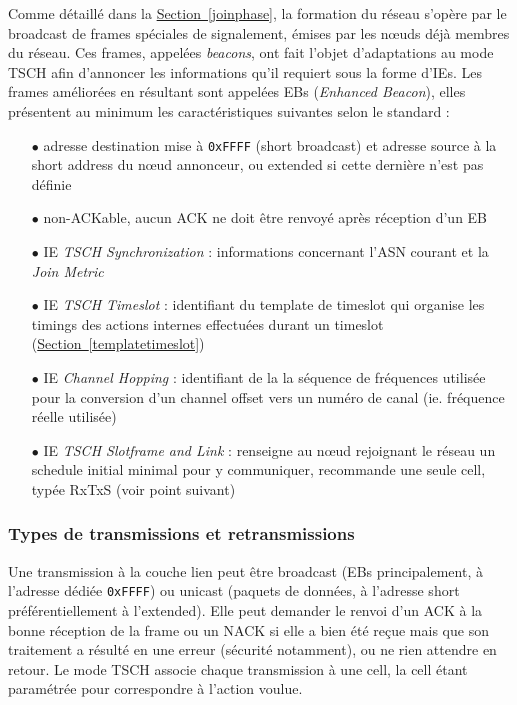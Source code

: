 \documentclass[]{report}
\newcommand{\wordlink}[2]{\hyperref[#2]{#1~\ref{#2}}}
\begin{document}
\par Comme détaillé dans la \wordlink{Section}{joinphase}, la formation du réseau s'opère par le broadcast de frames spéciales de signalement, émises par les nœuds déjà membres du réseau. Ces frames, appelées \textit{beacons}, ont fait l'objet d'adaptations au mode TSCH afin d'annoncer les informations qu'il requiert sous la forme d'IEs. Les frames améliorées en résultant sont appelées EBs (\textit{Enhanced Beacon}), elles présentent au minimum les caractéristiques suivantes selon le standard \cite{IEEE802.15.4} :
\vspace{0.2cm}
\begin{itemize}
\item[$\bullet$] adresse destination mise à \texttt{0xFFFF} (short broadcast) et adresse source à la short address du nœud annonceur, ou extended si cette dernière n'est pas définie
\vspace{0.1cm}
\item[$\bullet$] non-ACKable, aucun ACK ne doit être renvoyé après réception d'un EB
\vspace{0.1cm}
\item[$\bullet$] IE \textit{TSCH Synchronization} : informations concernant l'ASN courant et la \textit{Join Metric}
\item[$\bullet$] IE \textit{TSCH Timeslot} : identifiant du template de timeslot qui organise les timings des actions internes effectuées durant un timeslot (\wordlink{Section}{templatetimeslot})
\item[$\bullet$] IE \textit{Channel Hopping} : identifiant de la la séquence de fréquences utilisée pour la conversion d'un channel offset vers un numéro de canal (ie. fréquence réelle utilisée)
\item[$\bullet$] IE \textit{TSCH Slotframe and Link} : renseigne au nœud rejoignant le réseau un schedule initial minimal pour y communiquer, \cite{rfc8180} recommande une seule cell, typée RxTxS (voir point suivant)
\end{itemize}


\subsubsection{Types de transmissions et retransmissions}

\par Une transmission à la couche lien peut être broadcast (EBs principalement, à l'adresse dédiée \texttt{0xFFFF}) ou unicast (paquets de données, à l'adresse short préférentiellement à l'extended). Elle peut demander le renvoi d'un ACK à la bonne réception de la frame ou un NACK si elle a bien été reçue mais que son traitement a résulté en une erreur (sécurité notamment), ou ne rien attendre en retour. Le mode TSCH associe chaque transmission à une cell, la cell étant paramétrée pour correspondre à l'action voulue.\\
\end{document}
